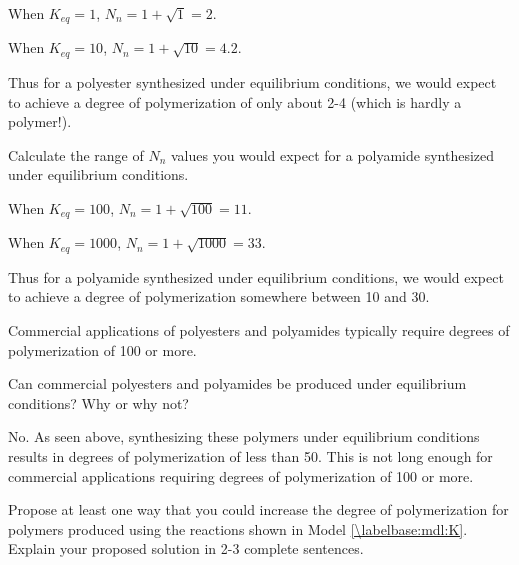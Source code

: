 \begin{activity}
\begin{ctqs}
			\begin{solution}[2in]
			
				When $K_{eq}=1$, $N_n = 1+ \sqrt{1} = 2$.
			
				When $K_{eq}=10$, $N_n = 1+ \sqrt{10} = 4.2$.
				
				Thus for a polyester synthesized under equilibrium conditions, we would expect to achieve a degree of polymerization of only about 2-4 (which is hardly a polymer!).			
			
			\end{solution}
		
		\question Calculate the range of $N_n$ values you would expect for a polyamide synthesized under equilibrium conditions.
		
			\begin{solution}[2in]
			
				When $K_{eq}=100$, $N_n = 1+ \sqrt{100} = 11$.
			
				When $K_{eq}=1000$, $N_n = 1+ \sqrt{1000} = 33$.
				
				Thus for a polyamide synthesized under equilibrium conditions, we would expect to achieve a degree of polymerization somewhere between 10 and 30.
			\end{solution}
		
\end{ctqs}

\begin{infobox}

	Commercial applications of polyesters and polyamides typically require degrees of polymerization of 100 or more.  

\end{infobox}

\begin{ctqs}
		
		\question Can commercial polyesters and polyamides be produced under equilibrium conditions?  Why or why not?
		
			\begin{solution}[2in]
			
				No. As seen above, synthesizing these polymers under equilibrium conditions results in degrees of polymerization of less than 50.  This is not long enough for commercial applications requiring degrees of polymerization of 100 or more.
			
			\end{solution}
			
		\question Propose at least one way that you could increase the degree of polymerization for polymers produced using the reactions shown in Model \ref{\labelbase:mdl:K}.  Explain your proposed solution in 2-3 complete sentences.
		

\end{ctqs}
\end{activity}
